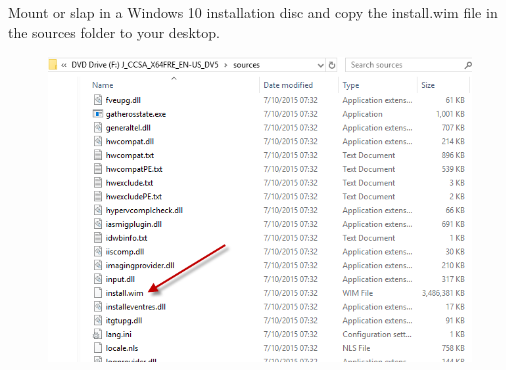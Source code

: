 \documentclass{article}
\begin{document}
\subsection{}
Mount or slap in a Windows 10 installation disc and copy the install.wim file in the sources folder to your desktop.
\begin{figure}[h]
	\centering
	\includegraphics[width=1\linewidth]{"sysprep/3-23-2018 13-23-45"}
\end{figure}
\newpage
\end{document}
